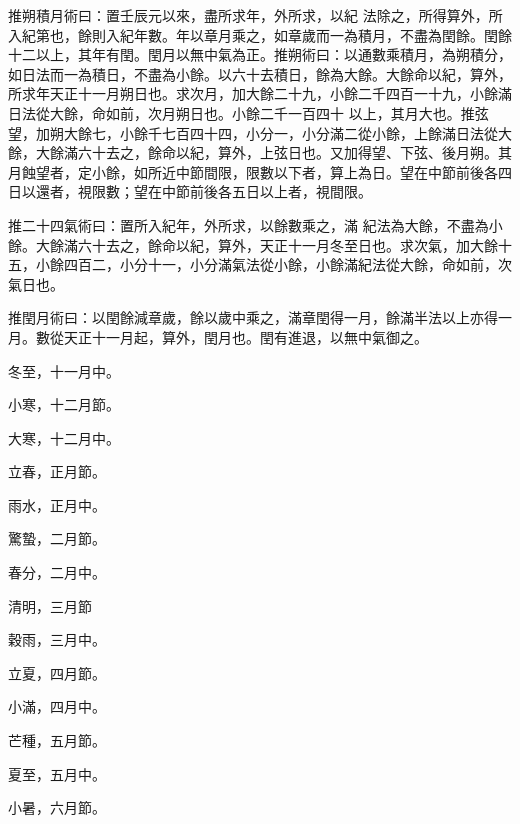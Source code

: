 \begin{pinyinscope}
 推朔積月術曰：置壬辰元以來，盡所求年，外所求，以紀
 法除之，所得算外，所入紀第也，餘則入紀年數。年以章月乘之，如章歲而一為積月，不盡為閏餘。閏餘十二以上，其年有閏。閏月以無中氣為正。推朔術曰：以通數乘積月，為朔積分，如日法而一為積日，不盡為小餘。以六十去積日，餘為大餘。大餘命以紀，算外，所求年天正十一月朔日也。求次月，加大餘二十九，小餘二千四百一十九，小餘滿日法從大餘，命如前，次月朔日也。小餘二千一百四十
 以上，其月大也。推弦望，加朔大餘七，小餘千七百四十四，小分一，小分滿二從小餘，上餘滿日法從大餘，大餘滿六十去之，餘命以紀，算外，上弦日也。又加得望、下弦、後月朔。其月蝕望者，定小餘，如所近中節間限，限數以下者，算上為日。望在中節前後各四日以還者，視限數；望在中節前後各五日以上者，視間限。



 推二十四氣術曰：置所入紀年，外所求，以餘數乘之，滿
 紀法為大餘，不盡為小餘。大餘滿六十去之，餘命以紀，算外，天正十一月冬至日也。求次氣，加大餘十五，小餘四百二，小分十一，小分滿氣法從小餘，小餘滿紀法從大餘，命如前，次氣日也。



 推閏月術曰：以閏餘減章歲，餘以歲中乘之，滿章閏得一月，餘滿半法以上亦得一月。數從天正十一月起，算外，閏月也。閏有進退，以無中氣御之。


冬至，十一月中。


小寒，十二月節。


大寒，十二月中。


立春，正月節。


雨水，正月中。


驚蟄，二月節。


春分，二月中。


清明，三月節


穀雨，三月中。


立夏，四月節。


小滿，四月中。


芒種，五月節。


夏至，五月中。


小暑，六月節。



\end{pinyinscope}
